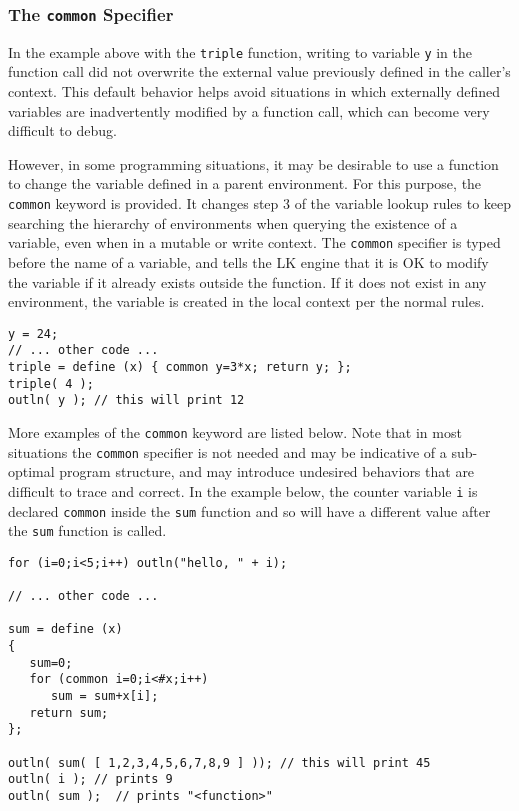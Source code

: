 \documentclass{article}
\begin{document}
\subsubsection{The \texttt{common} Specifier}

In the example above with the \texttt{triple} function, writing to variable \texttt{y} in the function call did not overwrite the external value previously defined in the caller's context.  This default behavior helps avoid situations in which externally defined variables are inadvertently modified by a function call, which can become very difficult to debug.

However, in some programming situations, it may be desirable to use a function to change the variable defined in a parent environment.  For this purpose, the \texttt{common} keyword is provided.  It changes step 3 of the variable lookup rules to keep searching the hierarchy of environments when querying the existence of a variable, even when in a mutable or write context.  The \texttt{common} specifier is typed before the name of a variable, and tells the LK engine that it is OK to modify the variable if it already exists outside the function.  If it does not exist in any environment, the variable is created in the local context per the normal rules.

\begin{verbatim}
y = 24;
// ... other code ...
triple = define (x) { common y=3*x; return y; };
triple( 4 );
outln( y ); // this will print 12
\end{verbatim}

More examples of the \texttt{common} keyword are listed below.  Note that in most situations the \texttt{common} specifier is not needed and may be indicative of a sub-optimal program structure, and may introduce undesired behaviors that are difficult to trace and correct.  In the example below, the counter variable \texttt{i} is declared \texttt{common} inside the \texttt{sum} function and so will have a different value after the \texttt{sum} function is called.


\begin{verbatim}
for (i=0;i<5;i++) outln("hello, " + i);

// ... other code ...

sum = define (x) 
{ 
   sum=0;
   for (common i=0;i<#x;i++)
      sum = sum+x[i];
   return sum;
};

outln( sum( [ 1,2,3,4,5,6,7,8,9 ] )); // this will print 45
outln( i ); // prints 9
outln( sum );  // prints "<function>"
\end{verbatim}
\end{document}
